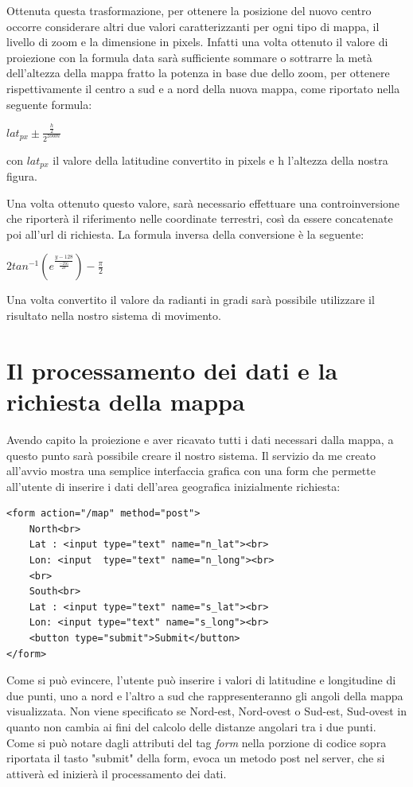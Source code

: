 Ottenuta questa trasformazione, per ottenere la posizione del nuovo centro occorre considerare altri due valori caratterizzanti per ogni tipo di mappa, il livello di zoom e la dimensione in pixels. Infatti una volta ottenuto il valore di proiezione con la formula data sarà sufficiente sommare o sottrarre la metà dell'altezza della mappa fratto la potenza in base due dello zoom, per ottenere rispettivamente il centro a sud e a nord della nuova mappa, come riportato nella seguente formula:
\begin{center}

	\large $ lat_{px} \pm \frac{\frac{h}{2}}{2^{zoom}} $\par

\end{center}
con $lat_{px}$ il valore della latitudine convertito in pixels e h l'altezza della nostra figura.

Una volta ottenuto questo valore, sarà necessario effettuare una controinversione che riporterà il riferimento nelle coordinate terrestri, così da essere concatenate poi all'url di richiesta.
La formula inversa della conversione è la seguente:
\begin{center}

	\large $2tan^{-1}(e^{\frac{y-128}{\frac{-256}{2\pi}}}) - \frac{\pi}{2}$\par

\end{center}
Una volta convertito il valore da radianti in gradi sarà possibile utilizzare il risultato nella nostro sistema di movimento.

\section{Il processamento dei dati e la richiesta della mappa}
Avendo capito la proiezione e aver ricavato tutti i dati necessari dalla mappa, a questo punto sarà possibile creare il nostro sistema. Il servizio da me creato all'avvio mostra una semplice interfaccia grafica con una form che permette all'utente di inserire i dati dell'area geografica inizialmente richiesta:
\begin{lstlisting}
<form action="/map" method="post">
    North<br>
    Lat : <input type="text" name="n_lat"><br>
    Lon: <input  type="text" name="n_long"><br>
    <br>
    South<br>
    Lat : <input type="text" name="s_lat"><br>
    Lon: <input type="text" name="s_long"><br>
    <button type="submit">Submit</button>
</form>
\end{lstlisting}
Come si può evincere, l'utente può inserire i valori di latitudine e longitudine di due punti, uno a nord e l'altro a sud che rappresenteranno gli angoli della mappa visualizzata. Non viene specificato se Nord-est, Nord-ovest o Sud-est, Sud-ovest in quanto non cambia ai fini del calcolo delle distanze angolari tra i due punti. Come si può notare dagli attributi del tag \textit{form} nella porzione di codice sopra riportata il tasto "submit" della form, evoca un metodo post nel server, che si attiverà ed inizierà il processamento dei dati.

